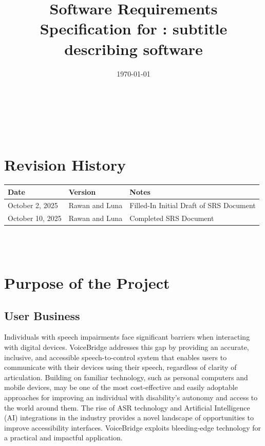 \documentclass[11pt]{article}
\begin{document}
\title{Software Requirements Specification for \progname: subtitle describing software} 
\author{\authname}
\date{\today}
	
\maketitle

~\newpage


\tableofcontents

~\newpage

\section*{Revision History}

\begin{tabularx}{\textwidth}{p{3cm}p{2cm}X}
\toprule {\textbf{Date}} & {\textbf{Version}} & {\textbf{Notes}}\\
\midrule
October 2, 2025 & Rawan and Luna & Filled-In Initial Draft of SRS Document\\
October 10, 2025 & Rawan and Luna & Completed SRS Document\\

\bottomrule
\end{tabularx}

~\\

~\newpage
\section{Purpose of the Project}
\subsection{User Business}


Individuals with speech impairments face significant barriers when interacting with digital devices. VoiceBridge addresses this gap by providing an accurate, inclusive, and accessible speech-to-control system that enables users to communicate with their devices using their speech, regardless of clarity of articulation. Building on familiar technology, such as personal computers and mobile devices, may be one of the most cost-effective and easily adoptable approaches for improving an individual with disability’s autonomy and access to the world around them. The rise of ASR technology and Artificial Intelligence (AI) integrations in the industry provides a novel landscape of opportunities to improve accessibility interfaces. VoiceBridge exploits bleeding-edge technology for a practical and impactful application.
\end{document}
